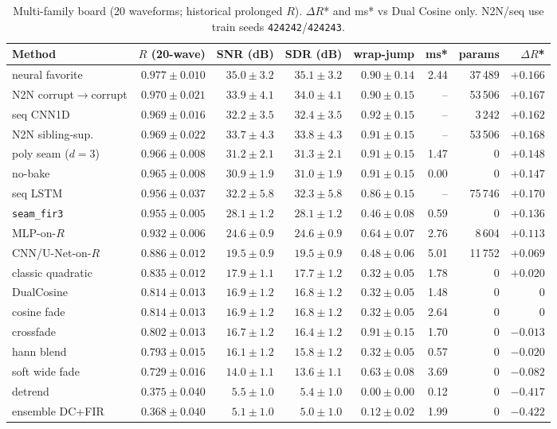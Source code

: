 \begin{table}[t]
  \centering
  \caption{Multi-family board (20 waveforms; historical prolonged $R$).
  $\Delta R$* and ms* vs Dual Cosine only. N2N/seq use train seeds \texttt{424242}/\texttt{424243}.}
  \label{tab:sota-main}
  \setlength{\tabcolsep}{2.2pt}
  \begin{tabular}{@{}lrrrrrrr@{}}
    \toprule
    Method & $R$ (20-wave) & SNR (dB) & SDR (dB) & wrap-jump & ms* & params & $\Delta R$* \\
    \midrule
    neural favorite & $0.977\pm0.010$ & $35.0\pm3.2$ & $35.1\pm3.2$ & $0.90\pm0.14$ & 2.44 & 37\,489 & ${+}0.166$ \\
    N2N corrupt$\to$corrupt & $0.970\pm0.021$ & $33.9\pm4.1$ & $34.0\pm4.1$ & $0.90\pm0.15$ & -- & 53\,506 & ${+}0.167$ \\
    seq CNN1D & $0.969\pm0.016$ & $32.2\pm3.5$ & $32.4\pm3.5$ & $0.92\pm0.15$ & -- & 3\,242 & ${+}0.162$ \\
    N2N sibling-sup. & $0.969\pm0.022$ & $33.7\pm4.3$ & $33.8\pm4.3$ & $0.91\pm0.15$ & -- & 53\,506 & ${+}0.168$ \\
    poly seam ($d{=}3$) & $0.966\pm0.008$ & $31.2\pm2.1$ & $31.3\pm2.1$ & $0.91\pm0.15$ & 1.47 & 0 & ${+}0.148$ \\
    no-bake & $0.965\pm0.008$ & $30.9\pm1.9$ & $31.0\pm1.9$ & $0.91\pm0.15$ & 0.00 & 0 & ${+}0.147$ \\
    seq LSTM & $0.956\pm0.037$ & $32.2\pm5.8$ & $32.3\pm5.8$ & $0.86\pm0.15$ & -- & 75\,746 & ${+}0.170$ \\
    \texttt{seam\_fir3} & $0.955\pm0.005$ & $28.1\pm1.2$ & $28.1\pm1.2$ & $0.46\pm0.08$ & 0.59 & 0 & ${+}0.136$ \\
    MLP-on-$R$ & $0.932\pm0.006$ & $24.6\pm0.9$ & $24.6\pm0.9$ & $0.64\pm0.07$ & 2.76 & 8\,604 & ${+}0.113$ \\
    CNN/U-Net-on-$R$ & $0.886\pm0.012$ & $19.5\pm0.9$ & $19.5\pm0.9$ & $0.48\pm0.06$ & 5.01 & 11\,752 & ${+}0.069$ \\
    classic quadratic & $0.835\pm0.012$ & $17.9\pm1.1$ & $17.7\pm1.2$ & $0.32\pm0.05$ & 1.78 & 0 & ${+}0.020$ \\
    DualCosine & $0.814\pm0.013$ & $16.9\pm1.2$ & $16.8\pm1.2$ & $0.32\pm0.05$ & 1.48 & 0 & $0$ \\
    cosine fade & $0.814\pm0.013$ & $16.9\pm1.2$ & $16.8\pm1.2$ & $0.32\pm0.05$ & 2.64 & 0 & $0$ \\
    crossfade & $0.802\pm0.013$ & $16.7\pm1.2$ & $16.4\pm1.2$ & $0.91\pm0.15$ & 1.70 & 0 & ${-}0.013$ \\
    hann blend & $0.793\pm0.015$ & $16.1\pm1.2$ & $15.8\pm1.2$ & $0.32\pm0.05$ & 0.57 & 0 & ${-}0.020$ \\
    soft wide fade & $0.729\pm0.016$ & $14.0\pm1.1$ & $13.6\pm1.1$ & $0.63\pm0.08$ & 3.69 & 0 & ${-}0.082$ \\
    detrend & $0.375\pm0.040$ & $5.5\pm1.0$ & $5.4\pm1.0$ & $0.00\pm0.00$ & 0.12 & 0 & ${-}0.417$ \\
    ensemble DC+FIR & $0.368\pm0.040$ & $5.1\pm1.0$ & $5.0\pm1.0$ & $0.12\pm0.02$ & 1.99 & 0 & ${-}0.422$ \\
    \bottomrule
  \end{tabular}
\end{table}

